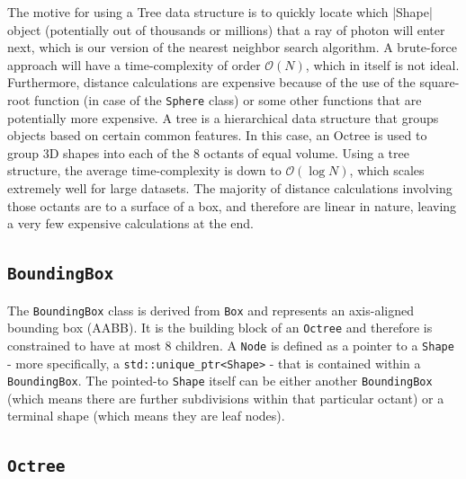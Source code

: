 
The motive for using a Tree data structure is to quickly locate which \text|Shape| object (potentially out of thousands or millions) that a ray of photon will enter next, which is our
version of the nearest neighbor search algorithm. A brute-force approach will have a time-complexity of order $\mathcal{O}(N)$, which in itself is not ideal. Furthermore, distance
calculations are expensive because of the use of the square-root function (in case of the \verb|Sphere| class) or some other functions that are potentially more expensive. A tree is a
hierarchical data structure that groups objects based on certain common features. In this case, an Octree is used to group 3D shapes into each of the 8 octants of equal volume. Using a
tree structure, the average time-complexity is down to $\mathcal{O}(\log N)$, which scales extremely well for large datasets. The majority of distance calculations involving those octants
are to a surface of a box, and therefore are linear in nature, leaving a very few expensive calculations at the end.

\subsection*{\texttt{BoundingBox}}
The \verb|BoundingBox| class is derived from \verb|Box| and represents an axis-aligned bounding box (AABB). It is the building block of an \verb|Octree| and therefore is constrained to
have at most 8 children. A \verb|Node| is defined as a pointer to a \verb|Shape| - more specifically, a \verb|std::unique_ptr<Shape>| - that is contained within a
\verb|BoundingBox|. The pointed-to \verb|Shape| itself can be either another \verb|BoundingBox| (which means there are further subdivisions within that particular octant) or a terminal
shape (which means they are leaf nodes). 

\subsection*{\texttt{Octree}}